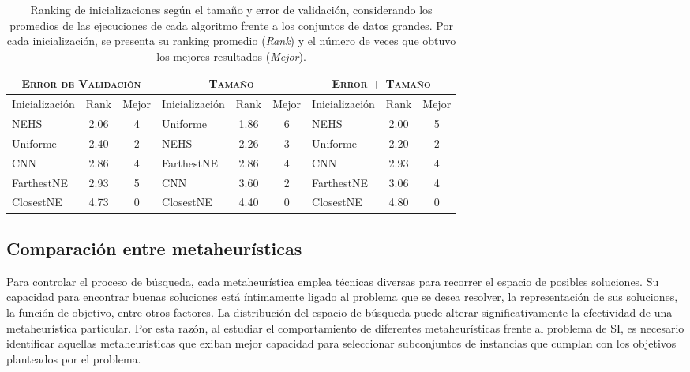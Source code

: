 \begin{table}[h!]
\centering
\begin{tabular}{l c c|l c c|l c c}
\hline
\multicolumn{3}{c|}{\textsc{Error de Validación}}
	& \multicolumn{3}{c|}{\textsc{Tamaño}}
	& \multicolumn{3}{c}{\textsc{Error + Tamaño}} \\
\hline
Inicialización & Rank & Mejor & Inicialización & Rank & Mejor & Inicialización & Rank & Mejor \\
\hline
\hline
NEHS       & 2.06 & 4 & Uniforme   & 1.86 & 6 & NEHS       & 2.00 & 5 \\
Uniforme   & 2.40 & 2 & NEHS       & 2.26 & 3 & Uniforme   & 2.20 & 2 \\
CNN        & 2.86 & 4 & FarthestNE & 2.86 & 4 & CNN        & 2.93 & 4 \\
FarthestNE & 2.93 & 5 & CNN        & 3.60 & 2 & FarthestNE & 3.06 & 4 \\
ClosestNE  & 4.73 & 0 & ClosestNE  & 4.40 & 0 & ClosestNE  & 4.80 & 0 \\
\hline
\end{tabular}
\caption[Ranking de inicializaciones según el tamaño y error de validación]{Ranking de inicializaciones según el tamaño y error de validación, considerando los promedios de las ejecuciones de cada algoritmo frente a los conjuntos de datos grandes. Por cada inicialización, se presenta su ranking promedio (\emph{Rank}) y el número de veces que obtuvo los mejores resultados (\emph{Mejor}).}
\label{table-inits-rank}
\end{table} 

\subsection{Comparación entre metaheurísticas}
\label{sec-comp-meta}

Para controlar el proceso de búsqueda, cada metaheurística emplea técnicas diversas para recorrer el espacio de posibles soluciones. Su capacidad para encontrar buenas soluciones está íntimamente ligado al problema que se desea resolver, la representación de sus soluciones, la función de objetivo, entre otros factores. La distribución del espacio de búsqueda puede alterar significativamente la efectividad de una metaheurística particular. Por esta razón, al estudiar el comportamiento de diferentes metaheurísticas frente al problema de SI, es necesario identificar aquellas metaheurísticas que exiban mejor capacidad para seleccionar subconjuntos de instancias que cumplan con los objetivos planteados por el problema.

